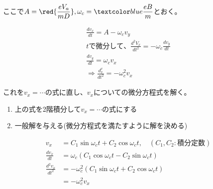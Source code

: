 \documentclass[12pt]{ltjsarticle}
\newcommand{\ds}{\displaystyle}
\begin{document}
ここで$\ds A=\red{\frac{eV_a}{mD}},\omega_c=\blue{\frac{eB}{m}}$とおく。

\begin{align*}
\frac{dv_x}{dt}=A-\omega_cv_y\\
tで微分して、\frac{d^2V_x}{dt^2}=-\omega_c\frac{dv_y}{dt}\\
\frac{dv_y}{dt}=\omega_cv_x\\
\Rightarrow \frac{d^v_x}{dt^2}=-\omega_c^2v_x
\end{align*}

これを$v_x=\cdots$の式に直し、$v_x$についての微分方程式を解く。
\begin{enumerate}
\item 上の式を2階積分して$v_x=\cdots$の式にする
\item 一般解を与える(微分方程式を満たすように解を決める)
\end{enumerate}

\begin{align*}
v_x&=C_1\sin{\omega_ct}+C_2\cos{\omega_ct},\quad (C_1,C_2:積分定数)\\
\frac{dv_x}{dt}&=\omega_c(C_1\cos{\omega_ct}-C_2\sin{\omega_ct})\\
\frac{d^2v_x}{dt^2}&=
-\omega_c^2(C_1\sin{\omega_ct}+C_2\cos{\omega_ct})\\
&=-\omega_c^2v_x
\end{align*}
\end{document}
